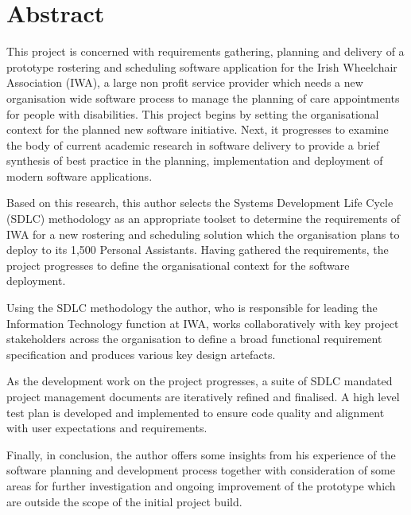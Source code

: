 \documentclass[a4paper,12pt]{article}
\begin{document}
\section*{Abstract}

This project is concerned with requirements gathering, planning and delivery of a prototype rostering and scheduling software application for the Irish Wheelchair Association (IWA), a large non profit service provider which needs a new organisation wide software process to manage the planning of care appointments for people with disabilities. This project begins by setting the organisational context for the planned new software initiative. Next, it progresses to examine the body of current academic research in software delivery to provide a brief synthesis of best practice in the planning, implementation and deployment of modern software applications.

Based on this research, this author selects the Systems Development Life Cycle (SDLC) methodology as an appropriate toolset to determine the requirements of IWA for a new rostering and scheduling solution which the organisation plans to deploy to its 1,500 Personal Assistants. Having gathered the requirements, the project progresses to define the organisational context for the software deployment.

Using the SDLC methodology the author, who is responsible for leading the Information Technology function at IWA, works collaboratively with key project stakeholders across the organisation to define a broad functional requirement specification and produces various key design artefacts.

As the development work on the project progresses, a suite of SDLC mandated project management documents are iteratively refined and finalised. A high level test plan is developed and implemented to ensure code quality and alignment with user expectations and requirements.

Finally, in conclusion, the author offers some insights from his experience of the software planning and development process together with consideration of some areas for further investigation and ongoing improvement of the prototype which are outside the scope of the initial project build.
\end{document}
